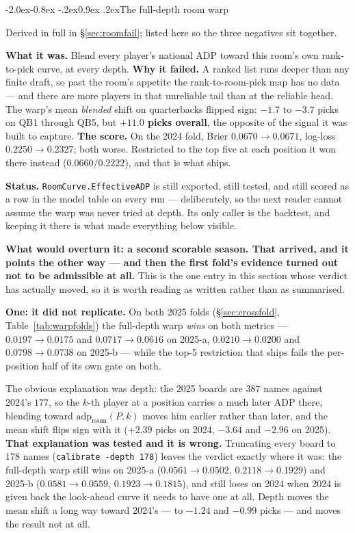 \documentclass[10pt,a4paper]{article}
\makeatletter
\theoremstyle{plain}
\theoremstyle{definition}
\theoremstyle{remark}
\newcommand{\code}[1]{\texttt{\small #1}}
\newcommand{\adp}{\mathrm{adp}}
\renewcommand\subsection{\@startsection{subsection}{2}{\z@}%
  {-2.0ex\@plus -0.8ex \@minus -.2ex}{0.9ex \@plus .2ex}{\normalfont\large\bfseries}}
\makeatother
\begin{document}
\subsection{The full-depth room warp}

Derived in full in \S\ref{sec:roomfail}; listed here so the three negatives sit together.

\textbf{What it was.} Blend every player's national ADP toward this room's own
rank-to-pick curve, at every depth. \textbf{Why it failed.} A ranked list runs deeper
than any finite draft, so past the room's appetite the rank-to-room-pick map has no data
--- and there are more players in that unreliable tail than at the reliable head. The
warp's mean \emph{blended} shift on quarterbacks flipped sign: $-1.7$ to $-3.7$ picks on
QB1 through QB5, but \textbf{$+11.0$ picks overall}, the opposite of the signal it was
built to capture. \textbf{The score.} On the 2024 fold, Brier $0.0670 \to 0.0671$, log-loss
$0.2250 \to 0.2327$; both worse. Restricted to the top five at each position it won there
instead ($0.0660 / 0.2222$), and that is what ships.

\textbf{Status.} \code{RoomCurve.EffectiveADP} is still exported, still tested, and still
scored as a row in the model table on every run --- deliberately, so the next reader
cannot assume the warp was never tried at depth. Its only caller is the backtest, and
keeping it there is what made everything below visible.

\textbf{What would overturn it: a second scorable season. That arrived, and it points the
other way --- and then the first fold's evidence turned out not to be admissible at all.}
This is the one entry in this section whose verdict has actually moved, so it is worth
reading as written rather than as summarised.

\textbf{One: it did not replicate.} On both 2025 folds (\S\ref{sec:crossfold},
Table~\ref{tab:warpfolds}) the full-depth warp \emph{wins} on both metrics ---
$0.0197 \to 0.0175$ and $0.0717 \to 0.0616$ on 2025-a, $0.0210 \to 0.0200$ and
$0.0798 \to 0.0738$ on 2025-b --- while the top-5 restriction that ships fails the
per-position half of its own gate on both.

The obvious explanation was depth: the 2025 boards are $387$ names against 2024's $177$,
so the $k$-th player at a position carries a much later ADP there, blending toward
$\adp_{\text{room}}(P,k)$ moves him earlier rather than later, and the mean shift flips
sign with it ($+2.39$ picks on 2024, $-3.64$ and $-2.96$ on 2025).
\textbf{That explanation was tested and it is wrong.} Truncating every board to $178$
names (\code{calibrate -depth 178}) leaves the verdict exactly where it was: the
full-depth warp still wins on 2025-a ($0.0561 \to 0.0502$, $0.2118 \to 0.1929$) and 2025-b
($0.0581 \to 0.0559$, $0.1923 \to 0.1815$), and still loses on 2024 when 2024 is given back
the look-ahead curve it needs to have one at all. Depth moves the mean shift a long way
toward 2024's --- to $-1.24$ and $-0.99$ picks --- and moves the result not at all.
\end{document}
